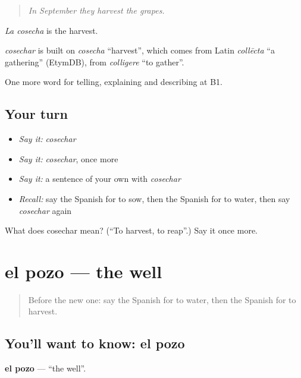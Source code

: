 \begin{quote}
\emph{In September they harvest the grapes.}
\end{quote}

\emph{La cosecha} is the harvest.

\begin{cousinweb}
\emph{cosechar} is built on \emph{cosecha} \textquotedblleft{}harvest\textquotedblright{}, which comes from Latin \emph{collēcta} \textquotedblleft{}a gathering\textquotedblright{} (EtymDB), from \emph{colligere} \textquotedblleft{}to gather\textquotedblright{}.
\end{cousinweb}

\begin{grammarlens}[title={What you've built}]
One more word for telling, explaining and describing at B1.
\end{grammarlens}

\subsection*{Your turn}
\begin{itemize}
\raggedright
  \item \emph{Say it:} \emph{cosechar}
  \item \emph{Say it:} \emph{cosechar}, once more
  \item \emph{Say it:} a sentence of your own with \emph{cosechar}
  \item \emph{Recall:} say the Spanish for to sow, then the Spanish for to water, then say \emph{cosechar} again
\end{itemize}

\begin{tcolorbox}[breakable,colback=teal!4,colframe=teal!35!black,title={Before you move on}]
What does cosechar mean? (\textquotedblleft{}To harvest, to reap\textquotedblright{}.) Say it once more.
\end{tcolorbox}
\section[el pozo]{el pozo — the well}

\label{lesson:ES-C692-pozo}



\begin{quote}
Before the new one: say the Spanish for to water, then the Spanish for to harvest.
\end{quote}

\subsection*{You'll want to know: el pozo}
\textbf{el pozo} — \textquotedblleft{}the well\textquotedblright{}.


